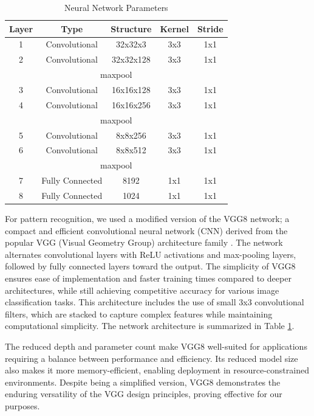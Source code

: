 \documentclass[conference]{IEEEtran}
\begin{document}
\begin{table}[!t]
    \centering
    \normalsize
    \begin{tabular}{|c||c|c|c|c|}
    \hline
        Layer & Type & Structure & Kernel & Stride \\ \hline  \hline
        1 & Convolutional & 32x32x3 & 3x3 & 1x1 \\ \hline
        2 & Convolutional & 32x32x128 & 3x3 & 1x1 \\ \hline \hline
        \multicolumn{5}{|c|}{maxpool} \\ \hline \hline
        3 & Convolutional & 16x16x128 & 3x3 & 1x1 \\ \hline
        4 & Convolutional & 16x16x256 & 3x3 & 1x1 \\ \hline\hline
        \multicolumn{5}{|c|}{maxpool} \\ \hline \hline
        5 & Convolutional & 8x8x256 & 3x3 & 1x1 \\ \hline
        6 & Convolutional & 8x8x512 & 3x3 & 1x1 \\ \hline \hline
        \multicolumn{5}{|c|}{maxpool} \\ \hline \hline
        7 & Fully Connected & 8192 & 1x1 & 1x1 \\ \hline
        8 & Fully Connected & 1024 & 1x1 & 1x1 \\ \hline 
    \end{tabular}
    \caption{Neural Network Parameters} 
    \label{table:vgg8}
\end{table}

For pattern recognition, we used a modified version of the VGG8 network; a compact and efficient convolutional neural network (CNN) derived from the popular VGG (Visual Geometry Group) architecture family \cite{simonyan_very_2015}.  
The network alternates convolutional layers with ReLU activations and max-pooling layers, followed by fully connected layers toward the output. The simplicity of VGG8 ensures ease of implementation and faster training times compared to deeper architectures, while still achieving competitive accuracy for various image classification tasks. This architecture includes the use of small 3x3 convolutional filters, which are stacked to capture complex features while maintaining computational simplicity. The network architecture is summarized in Table \ref{table:vgg8}.

The reduced depth and parameter count make VGG8 well-suited for applications requiring a balance between performance and efficiency. Its reduced model size also makes it more memory-efficient, enabling deployment in resource-constrained environments. Despite being a simplified version, VGG8 demonstrates the enduring versatility of the VGG design principles, proving effective for our purposes.
\end{document}
